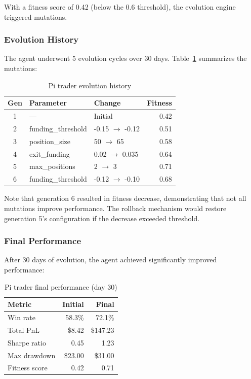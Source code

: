 \documentclass[conference]{IEEEtran}
\begin{document}
With a fitness score of 0.42 (below the 0.6 threshold), the evolution engine triggered mutations.

\subsubsection{Evolution History}

The agent underwent 5 evolution cycles over 30 days. Table~\ref{tab:pi_evolution} summarizes the mutations:

\begin{table}[h]
\centering
\caption{Pi trader evolution history}
\label{tab:pi_evolution}
\small
\begin{tabular}{cllr}
\toprule
\textbf{Gen} & \textbf{Parameter} & \textbf{Change} & \textbf{Fitness} \\
\midrule
1 & --- & Initial & 0.42 \\
2 & funding\_threshold & -0.15 $\to$ -0.12 & 0.51 \\
3 & position\_size & 50 $\to$ 65 & 0.58 \\
4 & exit\_funding & 0.02 $\to$ 0.035 & 0.64 \\
5 & max\_positions & 2 $\to$ 3 & 0.71 \\
6 & funding\_threshold & -0.12 $\to$ -0.10 & 0.68 \\
\bottomrule
\end{tabular}
\end{table}

Note that generation 6 resulted in fitness decrease, demonstrating that not all mutations improve performance. The rollback mechanism would restore generation 5's configuration if the decrease exceeded threshold.

\subsubsection{Final Performance}

After 30 days of evolution, the agent achieved significantly improved performance:

\begin{table}[h]
\centering
\caption{Pi trader final performance (day 30)}
\label{tab:pi_final}
\begin{tabular}{lrr}
\toprule
\textbf{Metric} & \textbf{Initial} & \textbf{Final} \\
\midrule
Win rate & 58.3\% & 72.1\% \\
Total PnL & \$8.42 & \$147.23 \\
Sharpe ratio & 0.45 & 1.23 \\
Max drawdown & \$23.00 & \$31.00 \\
Fitness score & 0.42 & 0.71 \\
\bottomrule
\end{tabular}
\end{table}
\end{document}

